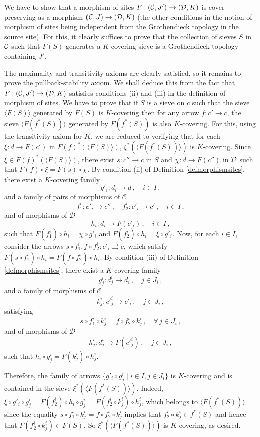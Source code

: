 \documentclass[a4paper,12pt]{article}
\begin{document}
\begin{proofs}
We have to show that a morphism of sites $F:({\cal C}, J')\to ({\cal D}, K)$ is cover-preserving as a morphism $({\cal C}, J)\to ({\cal D}, K)$ (the other conditions in the notion of morphism of sites being independent from the Grothendieck topology in the source site). For this, it clearly suffices to prove that the collection of sieves $S$ in $\cal C$ such that $F(S)$ generates a $K$-covering sieve is a Grothendieck topology containing $J'$. 

The maximality and transitivity axioms are clearly satisfied, so it remains to prove the pullback-stability axiom. We shall deduce this from the fact that $F:({\cal C}, J')\to ({\cal D}, K)$ satisfies conditions (ii) and (iii) in the definition of morphism of sites. We have to prove that if $S$ is a sieve on $c$ such that the sieve $\langle  F(S)\rangle$ generated by $F(S)$ is $K$-covering then for any arrow $f:c'\to c$, the sieve $\langle  F(f^{\ast}(S))\rangle  $ generated by $F(f^{\ast}(S))$ is also $K$-covering. For this, using the transitivity axiom for $K$, we are reduced to verifying that for each $\xi:d\to F(c')$ in $F(f)^{\ast}(\langle  F(S)\rangle  )$, $\xi^{\ast}(\langle  F(f^{\ast}(S))\rangle  )$ is $K$-covering. Since $\xi\in F(f)^{\ast}(\langle  F(S)\rangle  )$, there exist $s:c''\to c$ in $S$ and $\chi:d\to F(c'')$ in $\cal D$ such that $F(f)\circ \xi=F(s)\circ \chi$. By condition (ii) of Definition \ref{defmorphismsites}, there exist a $K$-covering family
$$
g'_i : d_i \longrightarrow d \, , \quad i \in I \, ,
$$
and a family of pairs of morphisms of ${\mathcal C}$
$$
f_1^i : c'_i \longrightarrow c'' \, , \quad f_2^i : c'_i \to c' \, , \quad i \in I \,  ,
$$
and of morphisms of ${\mathcal D}$
$$
h_i : d_i \longrightarrow F(c'_i) \, , \quad i \in I \, ,
$$
such that $F(f_1^i)\circ h_{i}=\chi \circ g'_i$ and $F(f_2^i)\circ h_{i}=\xi \circ g'_i$. Now, for each $i\in I$, consider the arrows $s\circ f_{1}^{i}, f\circ f_{2}^{i}: c'_{i} \rightrightarrows c$, which satisfy $F(s\circ f_{1}^{i})\circ h_{i}=F(f\circ f_{2}^{i})\circ h_{i}$. By condition (iii) of Definition \ref{defmorphismsites}, there exist a $K$-covering family
$$
g^i_j : d_j^i \longrightarrow d_{i} \, , \quad j \in J_{i} \, ,
$$
and a family of morphisms of ${\mathcal C}$
$$
k^i_j : {c'}_j^i \longrightarrow c'_{i}  \, , \quad j \in J_{i} \, ,
$$
satisfying
$$
s\circ f_{1}^{i} \circ k^i_j =f\circ f_{2}^{i} \circ k^i_j \, , \quad \forall \, j \in J_{i} \, ,
$$
and of morphisms of ${\mathcal D}$
$$
h^i_j : d^i_j \longrightarrow F({c'}_j^i) \, , \quad j \in J_{i} \, ,
$$
such that $h_{i}\circ g^i_j=F(k^i_j)\circ h^i_j$.

Therefore, the family of arrows $\{g'_i \circ g^i_j \mid i\in I, j\in J_{i}\}$ is $K$-covering and is contained in the sieve $\xi^{\ast}(\langle F(f^{\ast}(S))\rangle  )$. Indeed, $\xi\circ g'_i \circ g^i_j =F(f_2^i)\circ h_{i}\circ g^i_j=F(f_2^i \circ k^i_j)\circ h^i_j$, which belongs to $\langle F(f^{\ast}(S))\rangle  $ since the equality $s\circ f_{1}^{i} \circ k^i_j =f\circ f_{2}^{i} \circ k^i_j$ implies that $f_{2}^{i} \circ k^i_j\in f^{\ast}(S)$ and hence that $F(f_{2}^{i} \circ k^i_j)\in F(S)$. So $\xi^{\ast}(\langle F(f^{\ast}(S))\rangle  )$ is $K$-covering, as desired.	
\end{proofs}
\end{document}
